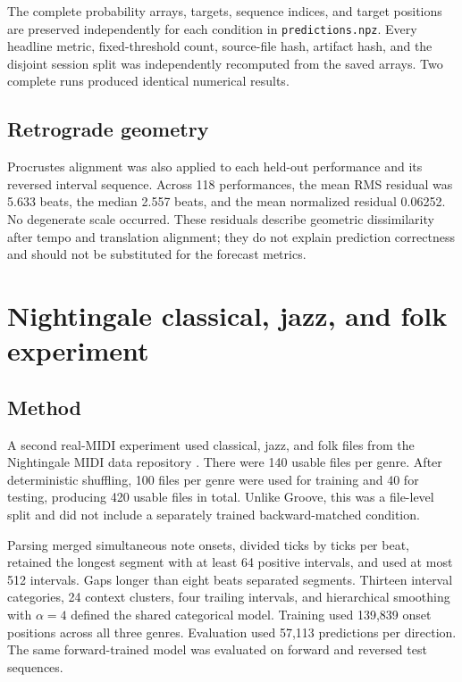 \documentclass[11pt,a4paper]{article}
\begin{document}
The complete probability arrays, targets, sequence indices, and target positions are preserved independently for each condition in \texttt{predictions.npz}. Every headline metric, fixed-threshold count, source-file hash, artifact hash, and the disjoint session split was independently recomputed from the saved arrays. Two complete runs produced identical numerical results.

\subsection{Retrograde geometry}
Procrustes alignment was also applied to each held-out performance and its reversed interval sequence. Across 118 performances, the mean RMS residual was 5.633 beats, the median 2.557 beats, and the mean normalized residual 0.06252. No degenerate scale occurred. These residuals describe geometric dissimilarity after tempo and translation alignment; they do not explain prediction correctness and should not be substituted for the forecast metrics.

\section{Nightingale classical, jazz, and folk experiment}
\subsection{Method}
A second real-MIDI experiment used classical, jazz, and folk files from the Nightingale MIDI data repository \cite{nightingale}. There were 140 usable files per genre. After deterministic shuffling, 100 files per genre were used for training and 40 for testing, producing 420 usable files in total. Unlike Groove, this was a file-level split and did not include a separately trained backward-matched condition.

Parsing merged simultaneous note onsets, divided ticks by ticks per beat, retained the longest segment with at least 64 positive intervals, and used at most 512 intervals. Gaps longer than eight beats separated segments. Thirteen interval categories, 24 context clusters, four trailing intervals, and hierarchical smoothing with $\alpha=4$ defined the shared categorical model. Training used 139,839 onset positions across all three genres. Evaluation used 57,113 predictions per direction. The same forward-trained model was evaluated on forward and reversed test sequences.
\end{document}
